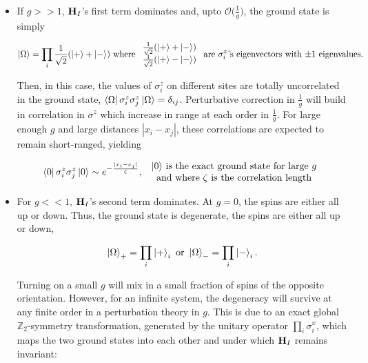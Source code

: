 \documentclass{homework}
\begin{document}
\begin{itemize}
    \item If $g >> 1$, ${\bf H}_I$'s first term dominates and, upto $\mathcal{O}\bigg(\frac{1}{g}\bigg)$, the ground state is simply 
    
    \begin{equation}
       \ket{\Omega} = \prod_{i} \frac{1}{\sqrt{2}} (\ket{+} + \ket{-}) \textnormal{ where } \begin{array}{cc}
           \frac{1}{\sqrt{2}} (\ket{+} + \ket{-})   \\
           \frac{1}{\sqrt{2}} (\ket{+} - \ket{-})  
       \end{array} \textnormal{ are $\sigma_i^x$'s eigenvectors with $\pm1$ eigenvalues.}
       \label{Q_Ising_large_g_GS}
    \end{equation}
    
    Then, in this case, the values of $\sigma_i^z$ on different sites are totally uncorrelated in the ground state, $\bra{\Omega} \sigma_i^z \sigma_j^z \ket{\Omega} = \delta_{ij}$. Perturbative correction in $\frac{1}{g}$ will build in correlation in $\sigma^z$ which increase in range at each order in $\frac{1}{g}$. For large enough $g$ and large distances $|x_i - x_j|$, these correlations are expected to remain short-ranged, yielding
    
    \begin{equation}
        \bra{0}\sigma_i^z \sigma_j^z \ket{0} \sim e^{-\frac{|x_i-x_j|}{\zeta}}, \begin{array}{c}
            \textnormal{ $\ket{0}$  is the exact ground state for large $g$}\\
            \textnormal{ and where $\zeta$ is the correlation length}
       \end{array}
       \label{Q_Ising_large_g_corr}
    \end{equation}
    
    \item For $g << 1$, ${\bf H}_I$'s second term dominates. At $g=0$,
    the spins are either all up or down. Thus, the ground state is degenerate, the spins are either all up or down,
    
    \begin{equation}
        \ket{\Omega}_+ = \prod_i \ket{+}_i \textnormal{ or } \ket{\Omega}_- = \prod_i \ket{-}_i.
        \label{Q_Ising_small_g_GS}
    \end{equation}
    
    Turning on a small $g$ will mix in a small fraction of spins of the opposite orientation.
    However, for an infinite system, the degeneracy will survive at any finite order in a perturbation theory in $g$. This is due to an exact global $\mathds{Z}_2$-symmetry transformation, generated by the unitary operator $\prod_i \sigma_i^x$, which maps the two ground states into each other and under which ${\bf H}_I$ remains invariant:
    

\end{itemize}
\end{document}
